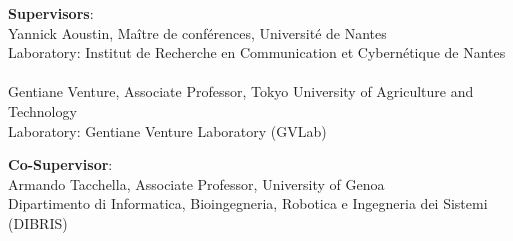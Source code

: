 \documentclass[11pt, openright]{Thesis} %
\begin{document}
\begin{titlepage}
	\noindent \textbf{Supervisors}:
	\\
	\noindent Yannick Aoustin, Ma\^{i}tre de conf\'{e}rences, Universit\'{e} de Nantes
	\\
	\noindent Laboratory: Institut de Recherche en Communication et Cybern\'{e}tique de Nantes\\
	\\				
	\noindent Gentiane Venture, Associate Professor, Tokyo University of Agriculture and Technology
	\\
	\noindent Laboratory: Gentiane Venture Laboratory (GVLab)
	\par
	\noindent \textbf{Co-Supervisor}:
	\\
	\noindent Armando Tacchella, Associate Professor, University of Genoa
	\\
	\noindent Dipartimento di Informatica, Bioingegneria, Robotica e Ingegneria dei Sistemi (DIBRIS) \\
\end{titlepage}


%
%
%
% 
% 
\end{document}
